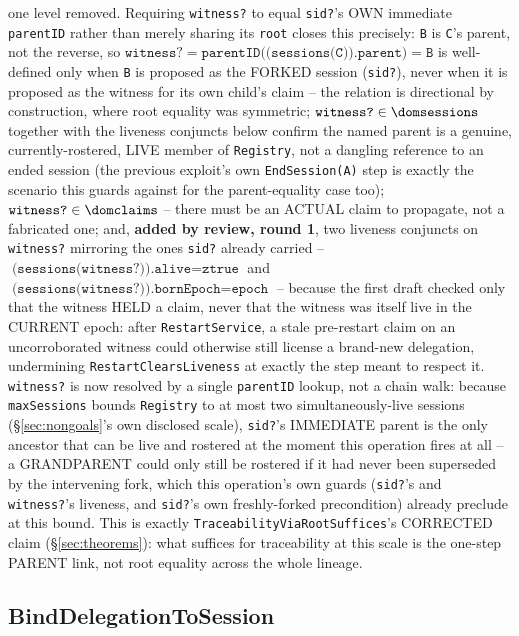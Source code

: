 \documentclass[a4paper,10pt,fleqn]{article}
\newcommand{\field}[1]{\texttt{#1}}
\begin{document}
one level removed. Requiring \field{witness?} to equal \field{sid?}'s
OWN immediate \field{parentID} rather than merely sharing its
\field{root} closes this precisely: \field{B} is \field{C}'s parent,
not the reverse, so $\field{witness?} = \field{parentID((sessions(C)).parent)}
= \field{B}$ is well-defined only when \field{B} is proposed as the
FORKED session (\field{sid?}), never when it is proposed as the
witness for its own child's claim -- the relation is directional by
construction, where root equality was symmetric; $\field{witness?} \in
\dom \field{sessions}$ together with the liveness conjuncts below
confirm the named parent is a genuine, currently-rostered, LIVE member
of \field{Registry}, not a dangling reference to an ended session (the
previous exploit's own \field{EndSession(A)} step is exactly the
scenario this guards against for the parent-equality case too);
$\field{witness?} \in \dom \field{claims}$ -- there must be an ACTUAL
claim to propagate, not a fabricated one; and, \textbf{added by review,
round 1}, two liveness conjuncts on \field{witness?} mirroring the ones
\field{sid?} already carried -- $\field{(sessions(witness?)).alive} =
\field{ztrue}$ and $\field{(sessions(witness?)).bornEpoch} =
\field{epoch}$ -- because the first draft checked only that the witness
HELD a claim, never that the witness was itself live in the CURRENT
epoch: after \field{RestartService}, a stale pre-restart claim on an
uncorroborated witness could otherwise still license a brand-new
delegation, undermining \field{RestartClearsLiveness} at exactly the
step meant to respect it. \field{witness?} is now resolved by a single
\field{parentID} lookup, not a chain walk: because \field{maxSessions}
bounds \field{Registry} to at most two simultaneously-live sessions
(\S\ref{sec:nongoals}'s own disclosed scale), \field{sid?}'s
IMMEDIATE parent is the only ancestor that can be live and rostered
at the moment this operation fires at all -- a GRANDPARENT could only
still be rostered if it had never been superseded by the intervening
fork, which this operation's own guards (\field{sid?}'s and
\field{witness?}'s liveness, and \field{sid?}'s own freshly-forked
precondition) already preclude at this bound. This is exactly
\field{TraceabilityViaRootSuffices}'s CORRECTED claim
(\S\ref{sec:theorems}): what suffices for traceability at this scale
is the one-step PARENT link, not root equality across the whole
lineage.

\subsection{BindDelegationToSession}
\label{sec:opbind}
\end{document}
